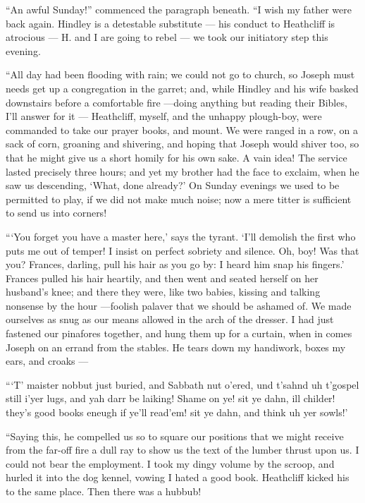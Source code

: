 \par “An awful Sunday!” commenced the paragraph beneath. “I wish my father were back again. Hindley is a detestable substitute — his conduct to Heathcliff is atrocious — H. and I are going to rebel — we took our initiatory step this evening.
\par “All day had been flooding with rain; we could not go to church, so Joseph must needs get up a congregation in the garret; and, while Hindley and his wife basked downstairs before a comfortable fire —doing anything but reading their Bibles, I'll answer for it — Heathcliff, myself, and the unhappy plough-boy, were commanded to take our prayer books, and mount. We were ranged in a row, on a sack of corn, groaning and shivering, and hoping that Joseph would shiver too, so that he might give us a short homily for his own sake. A vain idea! The service lasted precisely three hours; and yet my brother had the face to exclaim, when he saw us descending, ‘What, done already?’ On Sunday evenings we used to be permitted to play, if we did not make much noise; now a mere titter is sufficient to send us into corners!
\par “‘You forget you have a master here,’ says the tyrant. ‘I'll demolish the first who puts me out of temper! I insist on perfect sobriety and silence. Oh, boy! Was that you? Frances, darling, pull his hair as you go by: I heard him snap his fingers.’ Frances pulled his hair heartily, and then went and seated herself on her husband's knee; and there they were, like two babies, kissing and talking nonsense by the hour —foolish palaver that we should be ashamed of. We made ourselves as snug as our means allowed in the arch of the dresser. I had just fastened our pinafores together, and hung them up for a curtain, when in comes Joseph on an errand from the stables. He tears down my handiwork, boxes my ears, and croaks —
\par “‘T’ maister nobbut just buried, and Sabbath nut o'ered, und t'sahnd uh t'gospel still i'yer lugs, and yah darr be laiking! Shame on ye! sit ye dahn, ill childer! they's good books eneugh if ye'll read'em! sit ye dahn, and think uh yer sowls!’
\par “Saying this, he compelled us so to square our positions that we might receive from the far-off fire a dull ray to show us the text of the lumber thrust upon us. I could not bear the employment. I took my dingy volume by the scroop, and hurled it into the dog kennel, vowing I hated a good book. Heathcliff kicked his to the same place. Then there was a hubbub!
